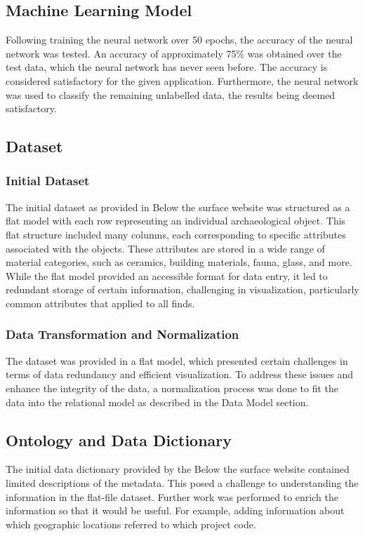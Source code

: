 \subsection{Machine Learning Model}
Following training the neural network over 50 epochs, the accuracy of the neural network was tested. An accuracy of approximately 75\% was obtained over the test data, which the neural network has never seen before. The accuracy is considered satisfactory for the given application. Furthermore, the neural network was used to classify the remaining unlabelled data, the results being deemed satisfactory.

\subsection{Dataset}

\subsubsection{Initial Dataset}
The initial dataset as provided in Below the surface website was structured as a flat model with each row representing an individual archaeological object. This flat structure included many columns, each corresponding to specific attributes associated with the objects. These attributes are stored in a wide range of material categories, such as ceramics, building materials, fauna, glass, and more. While the flat model provided an accessible format for data entry, it led to redundant storage of certain information, challenging in visualization, particularly common attributes that applied to all finds.

\subsubsection{Data Transformation and Normalization}
The dataset was provided in a flat model, which presented certain challenges in terms of data redundancy and efficient visualization. To address these issues and enhance the integrity of the data, a normalization process was done to fit the data into the relational model as described in the Data Model section.

\subsection{Ontology and Data Dictionary}
The initial data dictionary provided by the Below the surface website contained limited descriptions of the metadata. This posed a challenge to understanding the information in the flat-file dataset.  Further work was performed to enrich the information so that it would be useful.  For example, adding information about which geographic locations referred to which project code.

